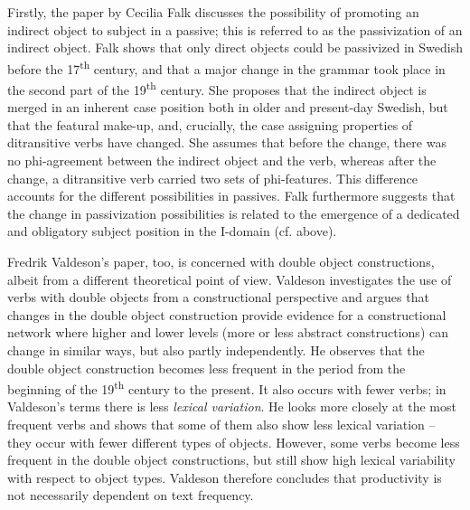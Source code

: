 \documentclass[output=paper]{langscibook}
\begin{document}
Firstly, the paper by Cecilia Falk discusses the possibility of promoting an indirect object to subject in a passive; this is referred to as the passivization of an indirect object. Falk shows that only direct objects could be passivized in Swedish before the 17\textsuperscript{th} century, and that a major change in the grammar took place in the second part of the 19\textsuperscript{th} century. She proposes that the indirect object is merged in an inherent case position both in older and present-day Swedish, but that the featural make-up, and, crucially, the case assigning properties of ditransitive verbs have changed. She assumes that before the change, there was no phi-agreement between the indirect object and the verb, whereas after the change, a ditransitive verb carried two sets of phi-features. This difference accounts for the different possibilities in passives. Falk furthermore suggests that the change in passivization possibilities is related to the emergence of a dedicated and obligatory subject position in the I-domain (cf.  above).



Fredrik Valdeson’s paper, too, is concerned with double object constructions, albeit from a different theoretical point of view. Valdeson investigates the use of verbs with double objects from a constructional perspective and argues that changes in the double object construction provide evidence for a constructional network where higher and lower levels (more or less abstract constructions) can change in similar ways, but also partly independently. He observes that the double object construction becomes less frequent in the period from the beginning of the 19\textsuperscript{th} century to the present. It also occurs with fewer verbs; in Valdeson’s terms there is less \textit{lexical variation}. He looks more closely at the most frequent verbs and shows that some of them also show less lexical variation – they occur with fewer different types of objects. However, some verbs become less frequent in the double object constructions, but still show high lexical variability with respect to object types. Valdeson therefore concludes that productivity is not necessarily dependent on text frequency.
\end{document}
